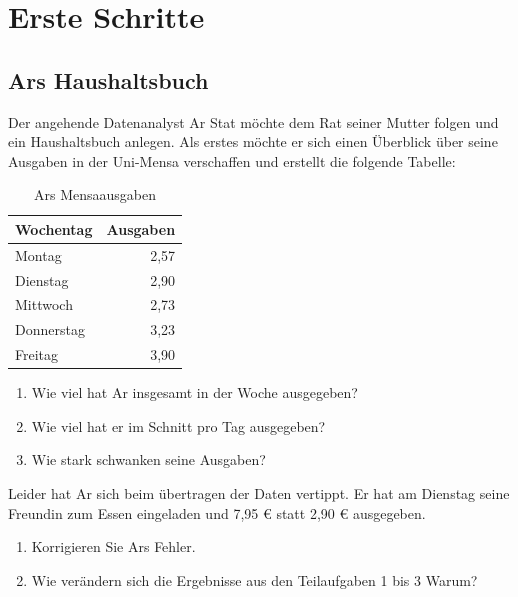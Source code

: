 \documentclass[]{book}
\providecommand{\tightlist}{%
  \setlength{\itemsep}{0pt}\setlength{\parskip}{0pt}}
\begin{document}
\hypertarget{erste-schritte}{%
\section{Erste Schritte}\label{erste-schritte}}

\hypertarget{ars-haushaltsbuch}{%
\subsection{Ars Haushaltsbuch}\label{ars-haushaltsbuch}}

Der angehende Datenanalyst Ar Stat möchte dem Rat seiner Mutter folgen und ein Haushaltsbuch anlegen. Als erstes möchte er sich einen Überblick über seine Ausgaben in der Uni-Mensa verschaffen und erstellt die folgende Tabelle:

\begin{table}

\caption{\label{tab:unnamed-chunk-29}Ars Mensaausgaben}
\centering
\begin{tabular}[t]{lr}
\toprule
Wochentag & Ausgaben\\
\midrule
Montag & 2,57\\
Dienstag & 2,90\\
Mittwoch & 2,73\\
Donnerstag & 3,23\\
Freitag & 3,90\\
\bottomrule
\end{tabular}
\end{table}

\begin{enumerate}
\def\labelenumi{\arabic{enumi}.}
\tightlist
\item
  Wie viel hat Ar insgesamt in der Woche ausgegeben?
\item
  Wie viel hat er im Schnitt pro Tag ausgegeben?
\item
  Wie stark schwanken seine Ausgaben?
\end{enumerate}

Leider hat Ar sich beim übertragen der Daten vertippt. Er hat am Dienstag seine Freundin zum Essen eingeladen und 7,95 € statt 2,90 € ausgegeben.

\begin{enumerate}
\def\labelenumi{\arabic{enumi}.}
\setcounter{enumi}{3}
\tightlist
\item
  Korrigieren Sie Ars Fehler.
\item
  Wie verändern sich die Ergebnisse aus den Teilaufgaben 1 bis 3 Warum?
\end{enumerate}
\end{document}
